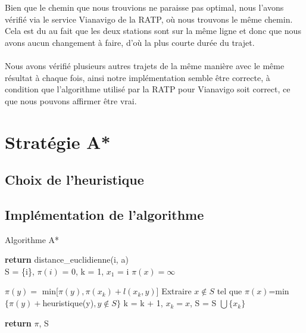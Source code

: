 \documentclass{article}
\begin{document}
Bien que le chemin que nous trouvions ne paraisse pas optimal, nous l'avons vérifié via
le service Vianavigo de la RATP, où nous trouvons le même chemin. Cela est du au fait que
les deux stations sont sur la même ligne et donc que nous avons aucun changement à faire,
d'où la plus courte durée du trajet.\\\\
Nous avons vérifié plusieurs autres trajets de la même manière avec le même résultat à chaque
fois, ainsi notre implémentation semble être correcte, à condition que l'algorithme
utilisé par la RATP pour Vianavigo soit correct, ce que nous pouvons affirmer être vrai.


\pagebreak
\section{Stratégie A*}

\subsection{Choix de l'heuristique}

\subsection{Implémentation de l'algorithme}

\begin{algorithm}
\caption{Algorithme A*}\label{astar}
\begin{algorithmic}[1]
 
	\State \textbf{return} distance\_euclidienne(i, a)
\EndProcedure
\\
	\State S = \{i\}, $\pi(i)$ = 0, k = 1, $x_1$ = i
		\State $\pi(x) = \infty$
	\EndFor
	
			\State $\pi(y) = $ min[$\pi(y), \pi(x_k) + l(x_k, y)$]
		\EndFor
		\State Extraire $x \not\in S$ tel que $\pi(x)$=min$\{\pi(y)+$heuristique(y)$, y \not\in S\}$
		\State k = k + 1, $x_k = x$, S = S $\bigcup \{x_k\}$
	\EndWhile
	
	\State \textbf{return} $\pi$, S
\EndProcedure
\end{algorithmic}
\end{algorithm}
\end{document}
